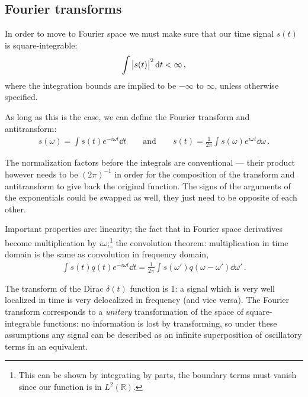\documentclass[main.tex]{subfiles}
\begin{document}

\subsection{Fourier transforms}

In order to move to Fourier space we must make sure that our time signal \(s(t)\) is square-integrable: 
%
\begin{align}
\int \abs{s(t)}^2 \dd{t} < \infty 
\,,
\end{align}
%
where the integration bounds are implied to be \(- \infty \) to \(\infty \), unless otherwise specified. 

As long as this is the case, we can define the Fourier transform and antitransform:  
%
\begin{align}
s(\omega ) = \int s(t) e^{-i \omega t} \dd{t}
\qquad \text{and} \qquad
s(t) = \frac{1}{2 \pi } \int s(\omega ) e^{i \omega t} \dd{\omega } 
\,.
\end{align}

The normalization factors before the integrals are conventional --- their product however needs to be \((2 \pi )^{-1}\) in order for the composition of the transform and antitransform to give back the original function. 
The signs of the arguments of the exponentials could be swapped as well, they just need to be opposite of each other. 

Important properties are: linearity; the fact that in Fourier space derivatives become multiplication by \(i \omega \);\footnote{This can be shown by integrating by parts, the boundary terms must vanish since our function is in \(L^2(\mathbb{R})\).}
the convolution theorem: multiplication in time domain is the same as convolution in frequency domain,
%
\begin{align}
\int s(t) q(t) e^{-i \omega t} \dd{t} = \frac{1}{2 \pi } \int s(\omega') q (\omega - \omega') \dd{\omega'}
\,.
\end{align}

The transform of the Dirac \(\delta(t) \) function is 1: a signal which is very well localized in time is very delocalized in frequency (and vice versa).
The Fourier transform corresponds to a \emph{unitary} transformation of the space of square-integrable functions: no information is lost by transforming, so under these assumptions any signal can be described as an infinite superposition of oscillatory terms in an equivalent. 
\end{document}
